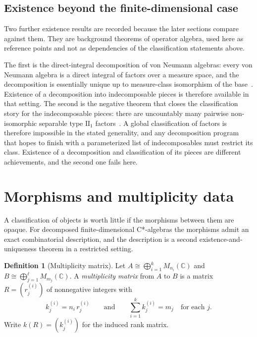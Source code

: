 \documentclass[11pt,letterpaper]{article}
\theoremstyle{definition}
\newtheorem{definition}[theorem]{Definition}
\theoremstyle{remark}
\begin{document}
\subsection{Existence beyond the finite-dimensional case}

Two further existence results are recorded because the later sections compare against them. They are background theorems of operator algebra, used here as reference points and not as dependencies of the classification statements above.

The first is the direct-integral decomposition of von Neumann algebras: every von Neumann algebra is a direct integral of factors over a measure space, and the decomposition is essentially unique up to measure-class isomorphism of the base~\cite{murray-vonneumann}. Existence of a decomposition into indecomposable pieces is therefore available in that setting. The second is the negative theorem that closes the classification story for the indecomposable pieces: there are uncountably many pairwise non-isomorphic separable type $\mathrm{II}_1$ factors~\cite{mcduff}. A global classification of factors is therefore impossible in the stated generality, and any decomposition program that hopes to finish with a parameterized list of indecomposables must restrict its class. Existence of a decomposition and classification of its pieces are different achievements, and the second one fails here.

\section{Morphisms and multiplicity data}

A classification of objects is worth little if the morphisms between them are opaque. For decomposed finite-dimensional C*-algebras the morphisms admit an exact combinatorial description, and the description is a second existence-and-uniqueness theorem in a restricted setting.

\begin{definition}[Multiplicity matrix]
\label{def:multiplicity-matrix}
Let $A \cong \bigoplus_{i=1}^{k} M_{n_i}(\mathbb{C})$ and $B \cong \bigoplus_{j=1}^{\ell} M_{m_j}(\mathbb{C})$. A \emph{multiplicity matrix} from $A$ to $B$ is a matrix $R = (r^{(i)}_j)$ of nonnegative integers with
\[
k^{(i)}_j = n_i \, r^{(i)}_j \qquad \text{and} \qquad \sum_{i=1}^{k} k^{(i)}_j = m_j \quad \text{for each } j.
\]
Write $k(R) = (k^{(i)}_j)$ for the induced rank matrix.
\end{definition}
\end{document}

